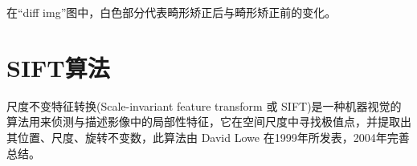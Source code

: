\documentclass[11pt]{article}
\begin{document}
    \begin{center}
    \end{center}
    
    \begin{center}
    \end{center}
在“diff img”图中，白色部分代表畸形矫正后与畸形矫正前的变化。
    
    \section{SIFT算法}
    尺度不变特征转换(Scale-invariant feature transform 或 SIFT)是一种机器视觉的算法用来侦测与描述影像中的局部性特征，它在空间尺度中寻找极值点，并提取出其位置、尺度、旋转不变数，此算法由 David Lowe 在1999年所发表，2004年完善总结。 
\end{document}
